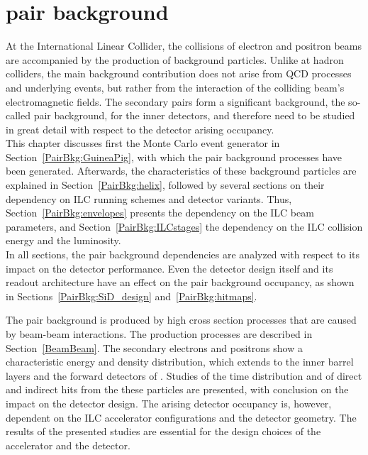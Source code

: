 \chapter{\positron\electron pair background}
\label{PairBkg}

\begin{chapterabstract}
 At the International Linear Collider, the collisions of electron and positron beams are accompanied by the production of background particles.
 Unlike at hadron colliders, the main background contribution does not arise from QCD processes and underlying events, but rather from the interaction of the colliding beam's electromagnetic fields.
 The secondary \positron\electron pairs form a significant background, the so-called pair background, for the inner detectors, and therefore need to be studied in great detail with respect to the detector arising occupancy.
 \\This chapter discusses first the Monte Carlo event generator in Section~\ref{PairBkg:GuineaPig}, with which the pair background processes have been generated.
 Afterwards, the characteristics of these background particles are explained in Section~\ref{PairBkg:helix}, followed by several sections on their dependency on ILC running schemes and \sid detector variants.
 Thus, Section~\ref{PairBkg:envelopes} presents the dependency on the ILC beam parameters, and Section~\ref{PairBkg:ILCstages} the dependency on the ILC collision energy and the luminosity.
 \\In all sections, the pair background dependencies are analyzed with respect to its impact on the \sid detector performance.
 Even the detector design itself and its readout architecture have an effect on the pair background occupancy, as shown in Sections~\ref{PairBkg:SiD_design} and~\ref{PairBkg:hitmaps}.
\end{chapterabstract}
\vspace*{0.5cm}\newline
\noindent
The pair background is produced by high cross section processes that are caused by beam-beam interactions.
The production processes are described in Section~\ref{BeamBeam}.
The secondary electrons and positrons show a characteristic energy and density distribution, which extends to the inner barrel layers and the forward detectors of \sid.
Studies of the time distribution and of direct and indirect hits from the these particles are presented, with conclusion on the impact on the detector design.
The arising detector occupancy is, however, dependent on the ILC accelerator configurations and the detector geometry.
The results of the presented studies are essential for the design choices of the accelerator and the \sid detector.

